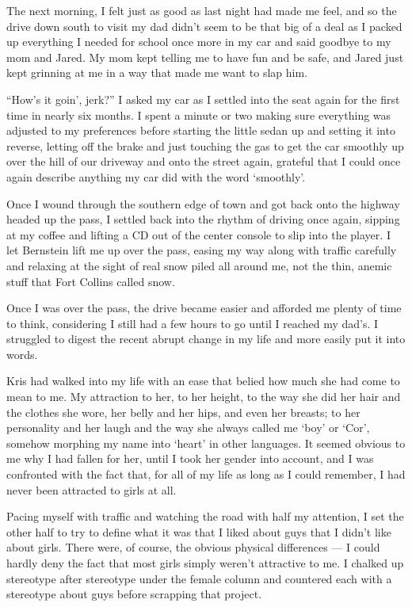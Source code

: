 The next morning, I felt just as good as last night had made me feel, and so the drive down south to visit my dad didn't seem to be that big of a deal as I packed up everything I needed for school once more in my car and said goodbye to my mom and Jared.  My mom kept telling me to have fun and be safe, and Jared just kept grinning at me in a way that made me want to slap him.

``How's it goin', jerk?'' I asked my car as I settled into the seat again for the first time in nearly six months.  I spent a minute or two making sure everything was adjusted to my preferences before starting the little sedan up and setting it into reverse, letting off the brake and just touching the gas to get the car smoothly up over the hill of our driveway and onto the street again, grateful that I could once again describe anything my car did with the word `smoothly'.

Once I wound through the southern edge of town and got back onto the highway headed up the pass, I settled back into the rhythm of driving once again, sipping at my coffee and lifting a CD out of the center console to slip into the player.  I let Bernstein lift me up over the pass, easing my way along with traffic carefully and relaxing at the sight of real snow piled all around me, not the thin, anemic stuff that Fort Collins called snow.

Once I was over the pass, the drive became easier and afforded me plenty of time to think, considering I still had a few hours to go until I reached my dad's.  I struggled to digest the recent abrupt change in my life and more easily put it into words.

Kris had walked into my life with an ease that belied how much she had come to mean to me.  My attraction to her, to her height, to the way she did her hair and the clothes she wore, her belly and her hips, and even her breasts; to her personality and her laugh and the way she always called me `boy' or `Cor', somehow morphing my name into `heart' in other languages.  It seemed obvious to me why I had fallen for her, until I took her gender into account, and I was confronted with the fact that, for all of my life as long as I could remember, I had never been attracted to girls at all.

Pacing myself with traffic and watching the road with half my attention, I set the other half to try to define what it was that I liked about guys that I didn't like about girls.  There were, of course, the obvious physical differences --- I could hardly deny the fact that most girls simply weren't attractive to me.  I chalked up stereotype after stereotype under the female column and countered each with a stereotype about guys before scrapping that project.

